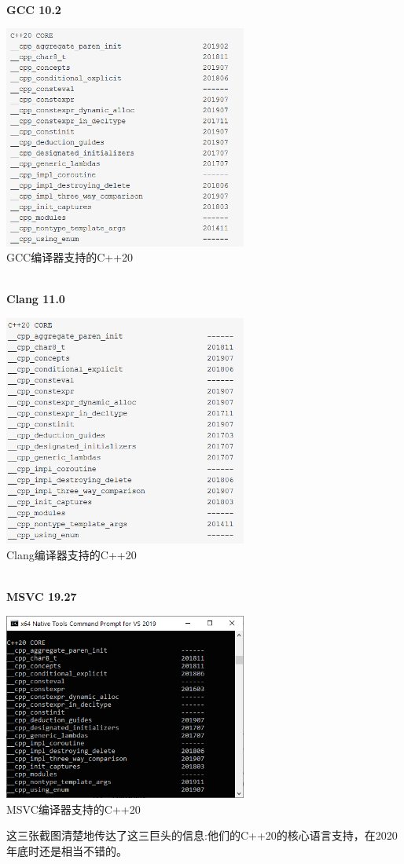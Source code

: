 \hspace*{\fill} \\ %
\noindent
\textbf{GCC 10.2}

\begin{center}
\includegraphics[width=0.6\textwidth]{content/5/chapter9/images/3.png}\\
GCC编译器支持的C++20
\end{center}


\hspace*{\fill} \\ %
\noindent
\textbf{Clang 11.0}

\begin{center}
\includegraphics[width=0.6\textwidth]{content/5/chapter9/images/4.png}\\
Clang编译器支持的C++20
\end{center}


\hspace*{\fill} \\ %
\noindent
\textbf{MSVC 19.27}

\begin{center}
\includegraphics[width=0.6\textwidth]{content/5/chapter9/images/5.png}\\
MSVC编译器支持的C++20
\end{center}

这三张截图清楚地传达了这三巨头的信息:他们的C++20的核心语言支持，在2020年底时还是相当不错的。


